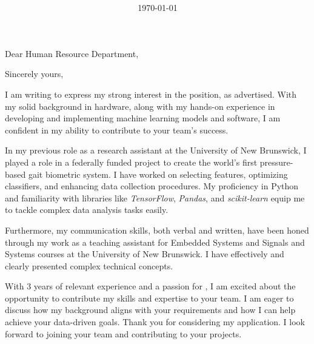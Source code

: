 \documentclass[11pt,letter,Script MT Bold]{moderncv}
\title{\textsc{\textbf{\normalsize \Title}}}
\begin{document}
\mobile{ \textbf{\MyPhone}}
\email{\MyEmail}
\homepage{\MyWebsite}
\social[github]{\MyGithub}
\social[linkedin]{\MyLinkedIn}

\clearpage

\date{\today} %
\opening{Dear Human Resource Department,} 
\closing{Sincerely yours,} 


\makelettertitle 

\justify

I am writing to express my strong interest in the \textit{\JobPosition} position, as advertised. With my solid background in hardware, along with my hands-on experience in developing and implementing machine learning models and software, I am confident in my ability to contribute to your team's success.

In my previous role as a research assistant at the University of New Brunswick, I played a role in a federally funded project to create the world's first pressure-based gait biometric system. I have worked on selecting features, optimizing classifiers, and enhancing data collection procedures. My proficiency in Python and familiarity with libraries like \textit{TensorFlow}, \textit{Pandas}, and \textit{scikit-learn} equip me to tackle complex data analysis tasks easily.

Furthermore, my communication skills, both verbal and written, have been honed through my work as a teaching assistant for Embedded Systems and Signals and Systems courses at the University of New Brunswick. I have effectively and clearly presented complex technical concepts.

With 3 years of relevant experience and a passion for \JobPosition, I am excited about the opportunity to contribute my skills and expertise to your team. I am eager to discuss how my background aligns with your requirements and how I can help achieve your data-driven goals. Thank you for considering my application. I look forward to joining your team and contributing to your projects.

\makeletterclosing


\newpage


\makecvtitle













\end{document}
